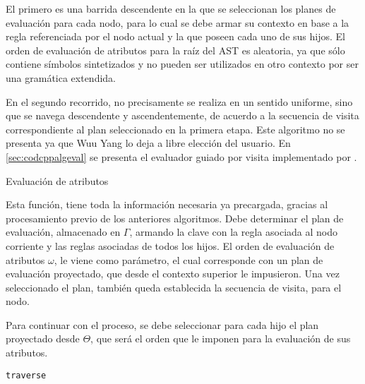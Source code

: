 El primero es una barrida descendente en la que se seleccionan los planes de evaluación para cada nodo, para lo cual se debe armar su contexto en base a la regla referenciada por el nodo actual y la que poseen cada uno de sus hijos. El orden de evaluación de atributos para la raíz del AST es aleatoria, ya que sólo contiene símbolos sintetizados y no pueden ser utilizados en otro contexto por ser una gramática extendida.

En el segundo recorrido, no precisamente se realiza en un sentido uniforme, sino que se navega descendente y ascendentemente, de acuerdo a la secuencia de visita correspondiente al plan seleccionado en la primera etapa. Este algoritmo no se presenta ya que Wuu Yang lo deja a libre elección del usuario. En \ref{sec:codcppalgeval} se presenta el evaluador guiado por visita implementado por \maggen.

\begin{algorithm}[H]

\caption{Evaluación de atributos}
\end{algorithm}

Esta función, tiene toda la información necesaria ya precargada, gracias al procesamiento previo de los anteriores algoritmos. Debe determinar el plan de evaluación, almacenado en $\Gamma$, armando la clave con la regla asociada al nodo corriente y las reglas asociadas de todos los hijos. El orden de evaluación de atributos $\omega$, le viene como parámetro, el cual corresponde con un plan de evaluación proyectado, que desde el contexto superior le impusieron. Una vez seleccionado el plan, también queda establecida la secuencia de visita, para el nodo.

Para continuar con el proceso, se debe seleccionar para cada hijo el plan proyectado desde $\Theta$, que será el orden que le imponen para la evaluación de sus atributos.

\begin{algorithm}[H]

\caption{\texttt{traverse}}
\end{algorithm}